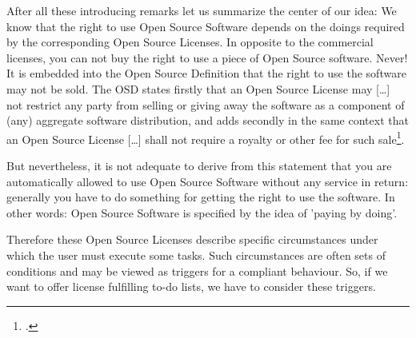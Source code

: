 %
%
%
%
%



After all these introducing remarks let us summarize the center of our idea: We
know that the right to use Open Source Software depends on the doings required
by the corresponding Open Source Licenses. In opposite to the commercial
licenses, you can not buy the right to use a piece of Open Source software.
Never! It is embedded into the Open Source Definition that the right to use the
software may not be sold. The OSD states firstly that an Open Source License may
\glqq{}[\ldots] not restrict any party from selling or giving away the software
as a component of (any) aggregate software distribution\grqq{}, and adds
secondly in the same context that an Open Source License \glqq{}[\ldots] shall
not require a royalty or other fee for such sale\grqq{}\footcite[cf.][\nopage
wp. §1]{OSI2012a}.

But nevertheless, it is not adequate to derive from this statement that you are
automatically allowed to use Open Source Software without any service in return:
generally you have to do something for getting the right to use the software. In
other words: Open Source Software is specified by the idea of 'paying by doing'.

Therefore these Open Source Licenses describe specific circumstances under
which the user must execute some tasks. Such circumstances are often sets of
conditions and may be viewed as triggers for a compliant behaviour. So, if we
want to offer license fulfilling to-do lists, we have to consider these triggers. 

